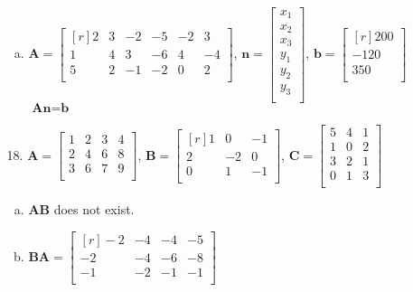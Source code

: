 \documentclass[letterpaper,fleqn]{article}
\begin{document}
\begin{enumerate}
\begin{enumerate}
\begin{enumerate}[(a)]
				\item
				$\textbf{A}=\begin{bmatrix*}[r]
					2 & 3 & -2 & -5 & -2 & 3 \\
					1 & 4 & 3 & -6 & 4 & -4 \\
					5 & 2 & -1 & -2 & 0 & 2 \\
				\end{bmatrix*}$, $\textbf{n}=\begin{bmatrix*}
					x_1 \\
					x_2 \\
					x_3 \\
					y_1 \\
					y_2 \\
					y_3 \\
				\end{bmatrix*}$, $\textbf{b}=\begin{bmatrix*}[r]
					200 \\
					-120 \\
					350 \\
				\end{bmatrix*}$ \\
				$\textbf{An}=\textbf{b}$ \\
			\end{enumerate}
			
			\item [18.]
			$\textbf{A}=\begin{bmatrix*}
				1 & 2 & 3 & 4 \\
				2 & 4 & 6 & 8 \\
				3 & 6 & 7 & 9 \\
			\end{bmatrix*}$, $\textbf{B}=\begin{bmatrix*}[r]
				1 & 0 & -1 \\
				2 & -2 & 0 \\
				0 & 1 & -1 \\
			\end{bmatrix*}$, $\textbf{C}=\begin{bmatrix*}
				5 & 4 & 1 \\
				1 & 0 & 2 \\
				3 & 2 & 1 \\
				0 & 1 & 3 \\
			\end{bmatrix*}$
			\begin{enumerate}[(a)]
				\item \textbf{AB} does not exist.
				
				\item $\textbf{BA}=\begin{bmatrix*}[r]
					-2 & -4 & -4 & -5 \\
					-2 & -4 & -6 & -8 \\
					-1 & -2 & -1 & -1 \\
				\end{bmatrix*}$
				

\end{enumerate}
\end{enumerate}
\end{enumerate}
\end{document}
